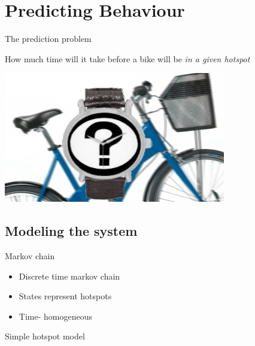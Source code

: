\section{Predicting Behaviour}
\begin{frame}{The prediction problem}
\begin{center}
How much time will it take before a bike will be \emph{in a given hotspot}

\includegraphics[width=0.8\linewidth]{graphics/biketime}
\end{center}

\end{frame}

\subsection{Modeling the system}

\begin{frame}{Markov chain}
\begin{itemize}
\item Discrete time markov chain
\item States represent hotspots
\item Time- homogeneous
\end{itemize}
\end{frame}

\begin{frame}{Simple hotspot model}

\end{frame}

